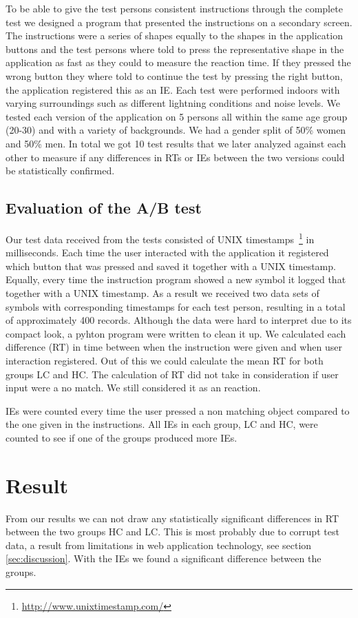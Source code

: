 \documentclass[runningheads,a4paper]{llncs}
\begin{document}
To be able to give the test persons consistent instructions through the complete test we designed a program that presented the instructions on a secondary screen. The instructions were a series of shapes equally to the shapes in the application buttons and the test persons where told to press the representative shape in the application as fast as they could to measure the reaction time. If they pressed the wrong button they where told to continue the test by pressing the right button, the application registered this as an IE. Each test were performed indoors with varying surroundings such as different lightning conditions and noise levels. We tested each version of the application on 5 persons all within the same age group (20-30) and with a variety of backgrounds. We had a gender split of 50\% women and 50\% men. In total we got 10 test results that we later analyzed against each other to measure if any differences in RTs or IEs between the two versions could be statistically confirmed.

\subsection{Evaluation of the A/B test}
Our test data received from the tests consisted of UNIX timestamps~\footnote{\url{http://www.unixtimestamp.com/}} in milliseconds. Each time the user interacted with the application it registered which button that was pressed and saved it together with a UNIX timestamp. Equally, every time the instruction program showed a new symbol it logged that together with a UNIX timestamp. As a result we received two data sets of symbols with corresponding timestamps for each test person, resulting in a total of approximately 400 records. Although the data were hard to interpret due to its compact look, a pyhton program were written to clean it up. We calculated each difference (RT) in time between when the instruction were given and when user interaction registered. Out of this we could calculate the mean RT for both groups LC and HC. The calculation of RT did not take in consideration if user input were a no match. We still considered it as an reaction.

IEs were counted every time the user pressed a non matching object compared to the one given in the instructions. All IEs in each group, LC and HC, were counted to see if one of the groups produced more IEs.

\section{Result}
From our results we can not draw any statistically significant differences in RT between the two groups HC and LC. This is most probably due to corrupt test data, a result from limitations in web application technology, see section \ref{sec:discussion}. With the IEs we found a significant difference between the groups.
\end{document}
